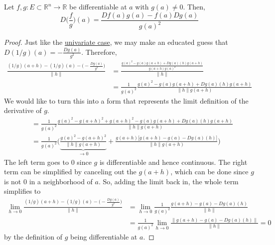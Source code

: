   \begin{lemma}
    \label{thm:quotient-rule}
		Let $f, g: E \subset \mathbb{R}^n \to \mathbb{R}$ be differentiable at $a$ with $g(a) \neq 0$. Then, 
		\begin{equation}
			D \Big( \frac{f}{g} \Big)(a) = \frac{D f(a) g(a) - f(a) D g(a)}{g(a)^2}
		\end{equation}
  \end{lemma}
	\begin{proof}
		Just like the \hyperref[real-thm:quotient_rule]{univariate case}, we may make an educated guess that $D(1/g)(a) = -\frac{Dg(a)}{g^2}$. Therefore, 
		\begin{align}
			\frac{(1/g)(a + h) - (1/g)(a) - \big( -\frac{Dg(a)}{g^2} \big)}{\|h\|} 
				& = \frac{\frac{g(a)^2 - g(a) g(a + h) + Dg(a) (h) g(a + h)}{g(a + h) g(a)^2}}{\|h\|} \\ 
				& = \frac{1}{g(a)^2} \frac{g(a)^2 - g(a)g(a + h) + Dg(a) (h) g(a + h)}{\|h\| g(a + h)}
		\end{align}
		We would like to turn this into a form that represents the limit definition of the derivative of $g$. 
		\begin{align}
			& = \frac{1}{g(a)^2} \frac{g(a)^2 - g(a + h)^2 + g(a + h)^2 - g(a)g(a + h) + Dg(a) (h) g(a + h)}{\|h\| g(a + h)} \\  
			& = \frac{1}{g(a)^2} \bigg( \underbrace{\frac{g(a)^2 - g(a + h)^2}{\|h\| g(a + h) }}_{\to 0} + \frac{g(a + h) \big[ g(a + h) - g(a) - Dg(a) (h)\big]}{\|h\| g(a + h)} \bigg) 
		\end{align}
		The left term goes to $0$ since $g$ is differentiable and hence continuous. The right term can be simplified by canceling out the $g(a + h)$, which can be done since $g$ is not $0$ in a neighborhood of $a$. So, adding the limit back in, the whole term simplifies to 
		\begin{align}
			\lim_{h \to 0} \frac{(1/g)(a + h) - (1/g)(a) - \big( -\frac{Dg(a)}{g^2} \big)}{\|h\|} 
				& = \lim_{h \to 0} \frac{1}{g(a)^2} \frac{g(a + h) - g(a) - Dg(a)(h)}{\|h\|} \\ 
				& = \frac{1}{g(a)^2} \lim_{h \to 0} \frac{\|g(a + h) - g(a) - Dg(a)(h)\|}{\|h\|} = 0
		\end{align}
		by the definition of $g$ being differentiable at $a$. 
	\end{proof}

